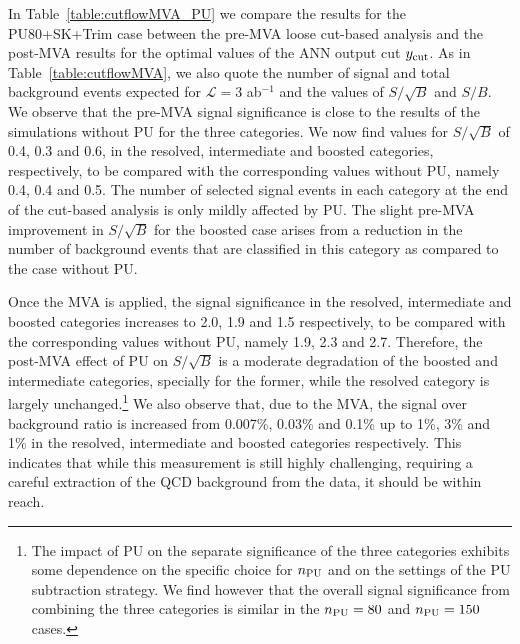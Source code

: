 In Table~\ref{table:cutflowMVA_PU} we compare the results
for the PU80+SK+Trim case between
  the pre-MVA loose cut-based analysis and
  the post-MVA results for the
  optimal values of the ANN output cut $y_{\rm cut}$.
  As in Table~\ref{table:cutflowMVA}, 
  we also quote 
   the number of signal and
    total background events expected
   for $\mathcal{L}=3$ ab$^{-1}$
    and the values of $S/\sqrt{B}$ and $S/B$.
%
We observe that the pre-MVA 
signal significance is close
to the results of the simulations
without PU for the three categories.
%
We now find values for $S/\sqrt{B}$ of 0.4, 0.3 and 0.6, in the resolved,
intermediate and boosted categories, respectively, to be compared
with the corresponding values without PU, namely 0.4, 0.4 and 0.5.
%
The number of selected
signal events in each category at the
end of the cut-based analysis is only mildly affected
by PU.
%
The slight pre-MVA improvement in $S/\sqrt{B}$ for the
boosted case arises from a reduction in the number
of background events that are classified in this category
as compared to the case without PU.

Once the MVA is applied, the signal significance in the 
resolved, intermediate and boosted
categories increases to 2.0, 1.9 and 1.5 respectively,
to be compared with the corresponding values
without PU, namely 1.9, 2.3 and 2.7.
%
Therefore, the post-MVA effect of PU on $S/\sqrt{B}$ is
a moderate degradation of the boosted and intermediate categories,
specially for the former,
while the resolved category is largely unchanged.\footnote{
  The impact of PU on the  separate significance of
  the three categories exhibits some
  dependence on the specific choice for $n_{\rm PU}$  and on the settings
  of the PU subtraction strategy.
  We find however that the
  overall signal significance from combining the three
  categories is similar in the $n_{\rm PU}=80$ and
  $n_{\rm PU}=150$ cases.
}
%
We also observe that, due
to the MVA, the
signal over background ratio is increased from 0.007\%, 0.03\% and
0.1\% up to 1\%, 3\% and 1\% in the resolved, intermediate
and boosted categories respectively.
%
This indicates that while this measurement is still highly challenging,
requiring a careful extraction of the QCD
background from the data, it should be within reach.

